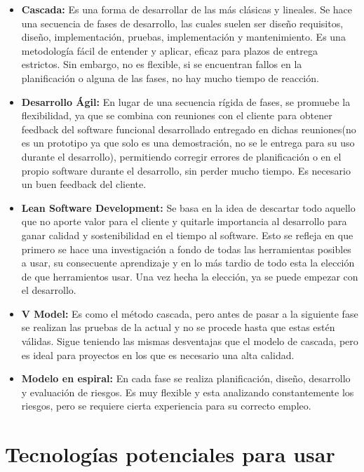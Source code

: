 \begin{itemize}
	\item \textbf{Cascada:} Es una forma de desarrollar de las más clásicas y lineales. Se hace una secuencia de fases de desarrollo, las cuales suelen ser diseño requisitos, diseño, implementación, pruebas, implementación y mantenimiento. Es una metodología fácil de entender y aplicar, eficaz para plazos de entrega estrictos. Sin embargo, no es flexible, si se encuentran fallos en la planificación o alguna de las fases, no hay mucho tiempo de reacción.
	\item \textbf{Desarrollo Ágil:} En lugar de una secuencia rígida de fases, se promuebe la flexibilidad, ya que se combina con reuniones con el cliente para obtener feedback del software funcional desarrollado entregado en dichas reuniones(no es un prototipo ya que solo es una demostración, no se le entrega para su uso durante el desarrollo), permitiendo corregir errores de planificación o en el propio software durante el desarrollo, sin perder mucho tiempo. Es necesario un buen feedback del cliente.
	\item \textbf{Lean Software Development: } Se basa en la idea de descartar todo aquello que no aporte valor para el cliente y quitarle importancia al desarrollo para ganar calidad y sostenibilidad en el tiempo al software. Esto se refleja en que primero se hace una investigación a fondo de todas las herramientas posibles a usar, su consecuente aprendizaje y en lo más tardio de todo esta la elección de que herramientos usar. Una vez hecha la elección, ya se puede empezar con el desarrollo.
	\item \textbf{V Model: } Es como el método cascada, pero antes de pasar a la siguiente fase se realizan las pruebas de la actual y no se procede hasta que estas estén válidas. Sigue teniendo las mismas desventajas que el modelo de cascada, pero es ideal para proyectos en los que es necesario una alta calidad.
	\item \textbf{Modelo en espiral: } En cada fase se realiza planificación, diseño, desarrollo y evaluación de riesgos. Es muy flexible y esta analizando constantemente los riesgos, pero se requiere cierta experiencia para su correcto empleo.
\end{itemize}

\section{Tecnologías potenciales para usar}

